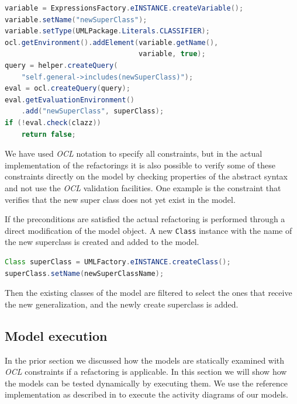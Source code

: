 \documentclass{llncs}
\begin{document}
\begin{lstlisting}[language=Java,caption=OCL validation in Java,label=lst:ocl]
variable = ExpressionsFactory.eINSTANCE.createVariable();
variable.setName("newSuperClass");
variable.setType(UMLPackage.Literals.CLASSIFIER);
ocl.getEnvironment().addElement(variable.getName(),
                                variable, true);
query = helper.createQuery(
    "self.general->includes(newSuperClass)");
eval = ocl.createQuery(query);
eval.getEvaluationEnvironment()
    .add("newSuperClass", superClass);
if (!eval.check(clazz))
    return false;
\end{lstlisting}

We have used \textit{OCL} notation to specify all constraints, but in the actual implementation of the refactorings it
is also possible to verify some of these constraints directly on the model by checking properties of the abstract syntax
and not use the \textit{OCL} validation facilities. One example is the constraint that verifies that the new super class does not
yet exist in the model.

If the preconditions are satisfied the actual refactoring is performed through a direct modification of the model object.
A new \texttt{Class} instance with the name of the new superclass is created and added to the model. 

\begin{lstlisting}[language=Java,caption=UML element creation,label=lst:createclass]
Class superClass = UMLFactory.eINSTANCE.createClass();
superClass.setName(newSuperClassName);
\end{lstlisting}


Then the existing
classes of the model are filtered to select the ones that receive the new generalization, and the newly create superclass
is added.

\subsection{Model execution}
\label{sec:execution}
In the prior section we discussed how the models are statically examined with \textit{OCL} constraints if a refactoring 
is applicable. In this section we will show how the models can be tested dynamically by executing them. We use the 
reference implementation as described in \cite{DBLP:conf/models/MayerhoferLK12} to execute the activity diagrams of 
our models.
\end{document}
